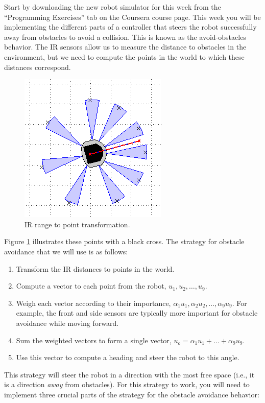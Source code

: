 \documentclass[10pt]{article}
\begin{document}
Start by downloading the new robot simulator for this week from the ``Programming Exercises'' tab on the Coursera course page. This week you will be implementing the different parts of a controller that steers the robot successfully away from obstacles to avoid a collision. This is known as the avoid-obstacles behavior. The IR sensors allow us to measure the distance to obstacles in the environment, but we need to compute the points in the world to which these distances correspond.
\begin{figure}[h]
 \centering
 \includegraphics[scale=0.5]{week-4-ir-points.png}
 \caption{IR range to point transformation.}
  \label{fig:week4irpoints}
\end{figure}
Figure \ref{fig:week4irpoints} illustrates these points with a black cross. The strategy for obstacle avoidance that we will use is as follows:

\begin{enumerate}
  \item Transform the IR distances to points in the world.
  \item Compute a vector to each point from the robot, $u_1,u_2,\ldots,u_9$.
  \item Weigh each vector according to their importance, $\alpha_1u_1,\alpha_2u_2,\ldots,\alpha_9u_9$. For example, the front and side sensors are typically more important for obstacle avoidance while moving forward.
  \item Sum the weighted vectors to form a single vector, $u_o=\alpha_1u_1+\ldots+\alpha_9u_9$.
  \item Use this vector to compute a heading and steer the robot to this angle.
\end{enumerate}

This strategy will steer the robot in a direction with the most free space (i.e., it is a direction \textit{away} from obstacles). For this strategy to work, you will need to implement three crucial parts of the strategy for the obstacle avoidance behavior:
\end{document}
